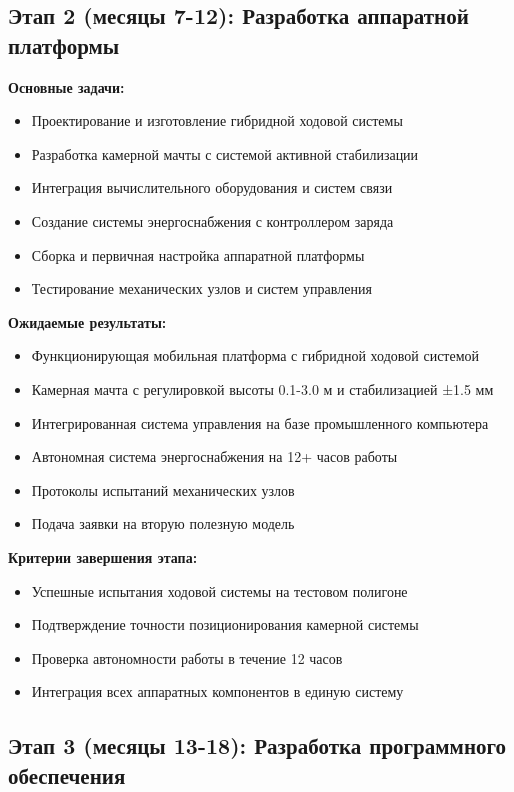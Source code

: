 \documentclass[12pt,a4paper]{article}
\begin{document}
\subsection{Этап 2 (месяцы 7-12): Разработка аппаратной платформы}

\textbf{Основные задачи:}
\begin{itemize}
    \item Проектирование и изготовление гибридной ходовой системы
    \item Разработка камерной мачты с системой активной стабилизации
    \item Интеграция вычислительного оборудования и систем связи
    \item Создание системы энергоснабжения с контроллером заряда
    \item Сборка и первичная настройка аппаратной платформы
    \item Тестирование механических узлов и систем управления
\end{itemize}

\textbf{Ожидаемые результаты:}
\begin{itemize}
    \item Функционирующая мобильная платформа с гибридной ходовой системой
    \item Камерная мачта с регулировкой высоты 0.1-3.0 м и стабилизацией ±1.5 мм
    \item Интегрированная система управления на базе промышленного компьютера
    \item Автономная система энергоснабжения на 12+ часов работы
    \item Протоколы испытаний механических узлов
    \item Подача заявки на вторую полезную модель
\end{itemize}

\textbf{Критерии завершения этапа:}
\begin{itemize}
    \item Успешные испытания ходовой системы на тестовом полигоне
    \item Подтверждение точности позиционирования камерной системы
    \item Проверка автономности работы в течение 12 часов
    \item Интеграция всех аппаратных компонентов в единую систему
\end{itemize}

\subsection{Этап 3 (месяцы 13-18): Разработка программного обеспечения}
\end{document}
